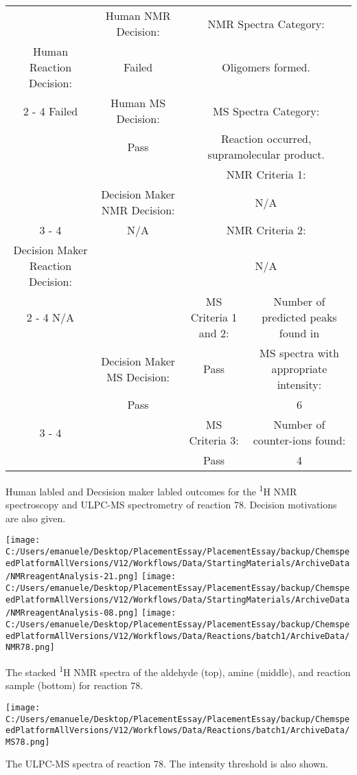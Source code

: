 \documentclass{article}%
\begin{document}
\begin{Decision Table}[H]%
\begin{tabular}{|c|c|c|c|}%
\hline%
&Human NMR Decision:&\multicolumn{2}{|c|}{NMR Spectra Category:}\\%
Human Reaction Decision:&Failed&\multicolumn{2}{|c|}{Oligomers formed.}\\%
\cline{2%
-%
4}%
Failed&Human MS Decision:&\multicolumn{2}{|c|}{MS Spectra Category:}\\%
&Pass&\multicolumn{2}{|c|}{Reaction occurred, supramolecular product.}\\%
\hline%
&&\multicolumn{2}{|c|}{NMR Criteria 1:}\\%
&Decision Maker NMR Decision:&\multicolumn{2}{|c|}{N/A}\\%
\cline{3%
-%
4}%
&N/A&\multicolumn{2}{|c|}{NMR Criteria 2:}\\%
Decision Maker Reaction Decision:&&\multicolumn{2}{|c|}{N/A}\\%
\cline{2%
-%
4}%
N/A&&MS Criteria 1 and 2:&Number of predicted peaks found in\\%
&Decision Maker MS Decision:&Pass&MS spectra with appropriate intensity:\\%
&Pass&&6\\%
\cline{3%
-%
4}%
&&MS Criteria 3:&Number of counter{-}ions found:\\%
&&Pass&4\\%
\hline%
\end{tabular}%
\caption{Human labled and Decsision maker labled outcomes for the \textsuperscript{1}H NMR spectroscopy and ULPC-MS spectrometry of reaction 78. Decision motivations are also given.}%
\end{Decision Table}%
\begin{NMR Spectra}[H]%
\begin{center}%
\texttt{[image: C:/Users/emanuele/Desktop/PlacementEssay/PlacementEssay/backup/ChemspeedPlatformAllVersions/V12/Workflows/Data/StartingMaterials/ArchiveData/NMRreagentAnalysis-21.png]}\hfill%
\texttt{[image: C:/Users/emanuele/Desktop/PlacementEssay/PlacementEssay/backup/ChemspeedPlatformAllVersions/V12/Workflows/Data/StartingMaterials/ArchiveData/NMRreagentAnalysis-08.png]}\hfill%
\texttt{[image: C:/Users/emanuele/Desktop/PlacementEssay/PlacementEssay/backup/ChemspeedPlatformAllVersions/V12/Workflows/Data/Reactions/batch1/ArchiveData/NMR78.png]}\hfill%
\end{center}%
\caption{The stacked \textsuperscript{1}H NMR spectra of the aldehyde (top), amine (middle), and reaction sample (bottom) for reaction 78.}%
\end{NMR Spectra}%
\begin{MS Spectra}[H]%
\begin{center}%
\texttt{[image: C:/Users/emanuele/Desktop/PlacementEssay/PlacementEssay/backup/ChemspeedPlatformAllVersions/V12/Workflows/Data/Reactions/batch1/ArchiveData/MS78.png]}\hfill%
\end{center}%
\caption{The ULPC-MS spectra of reaction 78. The intensity threshold is also shown.}%
\end{MS Spectra}%
\end{document}
